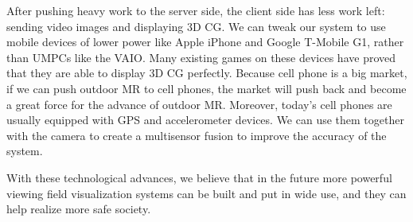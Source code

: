 After pushing heavy work to the server side, the client side has less work left: sending video images and displaying 3D CG. We can tweak our system to use mobile devices of lower power like Apple iPhone and Google T-Mobile G1, rather than UMPCs like the VAIO. Many existing games on these devices have proved that they are able to display 3D CG perfectly. Because cell phone is a big market, if we can push outdoor MR to cell phones, the market will push back and become a great force for the advance of outdoor MR. Moreover, today's cell phones are usually equipped with GPS and accelerometer devices. We can use them together with the camera to create a multisensor fusion \cite{Reference14} to improve the accuracy of the system.

With these technological advances, we believe that in the future more powerful viewing field visualization systems can be built and put in wide use, and they can help realize more safe society.
